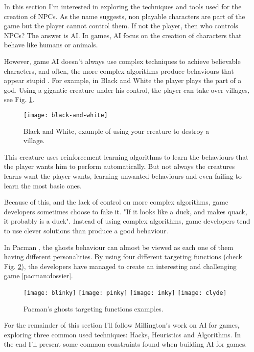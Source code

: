 In this section I'm interested in exploring the techniques and tools used for the creation of \ac{NPC}s.
As the name suggests, non playable characters are part of the game but the player cannot control them.
If not the player, then who controls \ac{NPC}s?
The answer is \ac{AI}.
In games, \ac{AI} focus on the creation of characters that behave like humans or animals.

However, game \ac{AI} doesn't always use complex techniques to achieve believable characters, and often, the more complex algorithms produce behaviours that appear stupid \cite{millington:AIgames}.
For example, in Black and White \cite{game:black&white} the player plays the part of a god.
Using a gigantic creature under his control, the player can take over villages, see Fig. \ref{fig:black-and-white}.
\begin{figure}
  \centering
    \texttt{[image: black-and-white]}
  \caption{Black and White, example of using your creature to destroy a village.}
  \label{fig:black-and-white}
\end{figure}
This creature uses reinforcement learning algorithms to learn the behaviours that the player wants him to perform automatically.
But not always the creatures learns want the player wants, learning unwanted behaviours and even failing to learn the most basic ones.

Because of this, and the lack of control on more complex algorithms, game developers sometimes choose to fake it.
"If it looks like a duck, and makes quack, it probably is a duck".
Instead of using complex algorithms, game developers tend to use clever solutions than produce a good behaviour.

In Pacman \cite{game:pacman}, the ghosts behaviour can almost be viewed as each one of them having different personalities. 
By using four different targeting functions (check Fig. \ref{fig:ghosts-targeting}), the developers have managed to create an interesting and challenging game \ref{pacman:dossier}.

\begin{figure}
\texttt{[image: blinky]}
\texttt{[image: pinky]}
\texttt{[image: inky]}
\texttt{[image: clyde]}
  \caption{Pacman's ghosts targeting functions examples.}
  \label{fig:ghosts-targeting}
\end{figure}

For the remainder of this section I'll follow Millington's work \cite{millington:AIgames} on \ac{AI} for games, exploring three common used techniques: Hacks, Heuristics and Algorithms.
In the end I'll present some common constraints found when building \ac{AI} for games.


